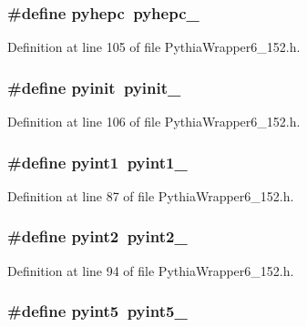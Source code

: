 \subsubsection{\setlength{\rightskip}{0pt plus 5cm}\#define pyhepc~pyhepc\_\-}\label{PythiaWrapper6__152_8h_760746aef0163099ae3426a53c165142}




Definition at line 105 of file Pythia\-Wrapper6\_\-152.h.
\subsubsection{\setlength{\rightskip}{0pt plus 5cm}\#define pyinit~pyinit\_\-}\label{PythiaWrapper6__152_8h_c0ceff918a25129e71d14e6bdcc15f83}




Definition at line 106 of file Pythia\-Wrapper6\_\-152.h.
\subsubsection{\setlength{\rightskip}{0pt plus 5cm}\#define pyint1~{\bf pyint1\_\-}}\label{PythiaWrapper6__152_8h_d83b4003fc0564d8224db1fc12a71a8d}




Definition at line 87 of file Pythia\-Wrapper6\_\-152.h.
\subsubsection{\setlength{\rightskip}{0pt plus 5cm}\#define pyint2~{\bf pyint2\_\-}}\label{PythiaWrapper6__152_8h_02425c70e715c36246b83643ea25d4c4}




Definition at line 94 of file Pythia\-Wrapper6\_\-152.h.
\subsubsection{\setlength{\rightskip}{0pt plus 5cm}\#define pyint5~{\bf pyint5\_\-}}\label{PythiaWrapper6__152_8h_eaf2a9dbc5f0cc71eb806a0901b4dc90}




